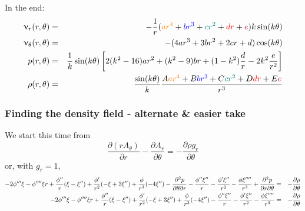 In the end:
\begin{eqnarray}
\upnu_r (r,\theta)&=& -\frac{1}{r} (
{\color{orange} ar^4}
+{\color{blue} br^3}
+{\color{teal}c r^2}
+ {\color{red}dr}
+{\color{purple}e}
)k\sin(k\theta)\\
\upnu_\theta(r,\theta)&=& -(4ar^3+3br^2 +2cr + d ) \cos(k\theta) \\
p(r,\theta) &= &
\frac{1}{k}\sin(k\theta) 
\left[
2(k^2-16)ar^2
+(k^2-9)br
+(1-k^2)\frac{d}{r}
-2k^2\frac{e}{r^2}
\right] \\
\rho(r,\theta)&=&\frac{\sin(k\theta)}{k}
\frac{
A{\color{orange} ar^4}+
B{\color{blue} br^3}+
C{\color{teal}c r^2} +
D {\color{red}dr}+
E{\color{purple}e}
}{r^3}
\end{eqnarray}

\subsubsection*{Finding the density field - alternate \& easier take}
We start this time from 
\[
\frac{\partial (r A_\theta)}{\partial r}
- \frac{\partial A_r}{\partial \theta}
= - \frac{\partial \rho g_r}{\partial \theta}
\]
or, with $g_r=1$,
\begin{eqnarray}
 -2\phi''' \xi - \phi'''' \xi r
+ \frac{\phi''}{r  }  (\xi -\xi'')
+ \frac{\phi'}{r^2}  ( - \xi +3\xi''  )
+ \frac{\phi}{r^3} (-4  \xi''  )
-\frac{\partial^2 p}{\partial \theta \partial r} 
-\frac{\phi'' \xi''}{r} - \frac{\phi' \xi''}{r^2} - \frac{\phi\xi'''' }{r^3}
+\frac{\partial^2 p}{\partial r \partial \theta}
&=&
- \frac{\partial \rho }{\partial \theta} 
\nonumber\\
 -2\phi''' \xi - \phi'''' \xi r
+ \frac{\phi''}{r  }  (\xi -\xi'')
+ \frac{\phi'}{r^2}  ( - \xi +3\xi''  )
+ \frac{\phi}{r^3} (-4  \xi''  )
-\frac{\phi'' \xi''}{r} - \frac{\phi' \xi''}{r^2} - \frac{\phi\xi'''' }{r^3}
&=&
- \frac{\partial \rho }{\partial \theta} \nonumber
\end{eqnarray}

